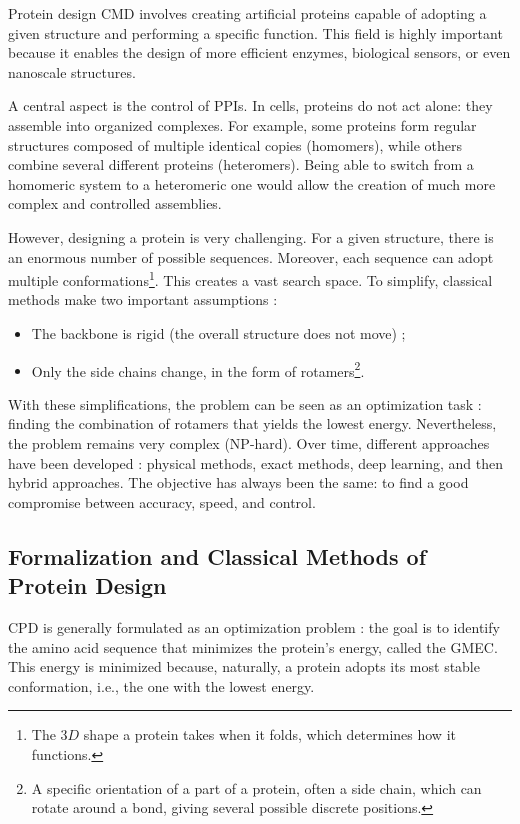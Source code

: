 \documentclass[a4paper]{article}
\begin{document}
Protein design \ac{CMD} involves creating artificial proteins capable of adopting a given structure and performing a specific function. This field is highly important because it enables the design of more efficient enzymes, biological sensors, or even nanoscale structures.
\newline

A central aspect is the control of \acp{PPI}. In cells, proteins do not act alone: they assemble into organized complexes. For example, some proteins form regular structures composed of multiple identical copies (homomers), while others combine several different proteins (heteromers). Being able to switch from a homomeric system to a heteromeric one would allow the creation of much more complex and controlled assemblies.
\newline

However, designing a protein is very challenging. For a given structure, there is an enormous number of possible sequences. Moreover, each sequence can adopt multiple conformations\footnote{The $3D$ shape a protein takes when it folds, which determines how it functions.}. This creates a vast search space.
To simplify, classical methods make two important assumptions :

\begin{itemize}
    \item The backbone is rigid (the overall structure does not move) ;
    \item Only the side chains change, in the form of rotamers\footnote{A specific orientation of a part of a protein, often a side chain, which can rotate around a bond, giving several possible discrete positions.}.
\end{itemize}

With these simplifications, the problem can be seen as an optimization task : finding the combination of rotamers that yields the lowest energy. Nevertheless, the problem remains very complex (NP-hard).
Over time, different approaches have been developed : physical methods, exact methods, deep learning, and then hybrid approaches. The objective has always been the same: to find a good compromise between accuracy, speed, and control.

\subsection{Formalization and Classical Methods of Protein Design}%

\ac{CPD} is generally formulated as an optimization problem : the goal is to identify the amino acid sequence that minimizes the protein’s energy, called the \ac{GMEC}. 
This energy is minimized because, naturally, a protein adopts its most stable conformation, i.e., the one with the lowest energy.
\end{document}
